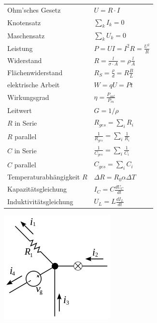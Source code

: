 \documentclass[12pt,a4paper]{article}
\renewcommand{\d}[2]{\frac{d #1}{d #2}}
\renewcommand{\=}[1]{\stackrel{#1}{=}}
\theoremstyle{definition}
\theoremstyle{remark}
\begin{document}
\begin{center}
\begin{minipage}[t]{.5\linewidth}
\vspace{0pt}
\noindent\begin{tabular}{ll}
Ohm'sches Gesetz & $U = R \cdot I$\\
Knotensatz & $\sum_k I_k = 0$\\
Maschensatz & $\sum_k U_k = 0$\\
Leistung & $P = U I = I^2 R = \frac{U^2}{R}$\\
Widerstand & $R = \frac{l}{\sigma \cdot A} = \rho \frac{l}{A}$\\
Flächenwiderstand & $R_S = \frac{\rho}{d} = R \frac{B}{L}$\\
elektrische Arbeit & $W = q U = P t$\\
Wirkungsgrad & $\eta = \frac{P_{out}}{P_{in}}$\\
Leitwert & $G = 1 / \rho$\\
$R$ in Serie & $R_{ges} = \sum_i R_i$\\
$R$ parallel & $\frac{1}{R_{ges}} = \sum_i \frac{1}{R_i}$\\
$C$ in Serie & $\frac{1}{C_{ges}} = \sum_i \frac{1}{C_i}$\\
$C$ parallel & $C_{ges} = \sum_i C_i$\\
Temperaturabhängigkeit $R$ & $\Delta R = R_0 \alpha \Delta T$\\
Kapazitätsgleichung & $I_C = C \d{U_C}{t}$\\
Induktivitätsgleichung & $U_L = L \d{I_L}{t}$\\
\end{tabular}
\end{minipage}%
\begin{minipage}[t]{.5\linewidth}
\vspace{0pt}
\includegraphics[width=\linewidth]{pic/knotenregel.png}

\end{minipage}
\end{center}
\end{document}
